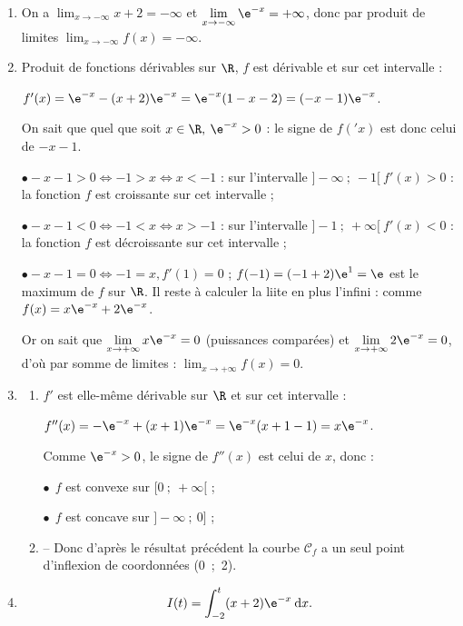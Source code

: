 \begin{enumerate}
\item 
On a $\displaystyle\lim_{x \to -\infty} x + 2 = - \infty$ et $\displaystyle\lim_{x \to -\infty}
\e^{-x} = + \infty$, donc par produit de limites $\displaystyle\lim_{x \to -\infty}f(x) = - \infty$.

\item 
Produit de fonctions dérivables sur $\R$, $f$ est dérivable et sur cet intervalle :

$f'(x) = \e^{-x} - (x + 2)\e^{-x} = \e^{-x}(1 - x - 2) = (- x - 1)\e^{-x}$.

On sait que quel que soit $x \in \R, \: \e^{-x} > 0$ : le signe de $f('x)$ est donc celui de $- x - 1$.

$\bullet -x - 1 > 0 \iff - 1 > x \iff x < - 1$ : sur l'intervalle $]- \infty~;~-1[ \: f'(x) > 0$ : la fonction $f$ est croissante sur cet intervalle ;

$\bullet -x - 1 < 0 \iff - 1 < x \iff x > - 1$ : sur l'intervalle $]-1 ~;~+\infty[\: f'(x) < 0$ : la fonction $f$ est décroissante sur cet intervalle ;

$\bullet -x - 1 = 0 \iff - 1 = x, f'(1) = 0$ ; $f(-1) = (-1 + 2)\e^{1} = \e$ est le maximum de $f$ sur $\R$.
Il reste à calculer la liite en plus l'infini : comme $f(x) = x\e^{-x} + 2\e^{-x}$.

Or on sait que $\displaystyle\lim_{x \to + \infty} x\e^{-x} = 0$ (puissances comparées) et $\displaystyle\lim_{x \to + \infty} 2\e^{-x} = 0$, d'où par somme de limites :
$\displaystyle\lim_{x \to + \infty} f(x) = 0$.

\item 
	\begin{enumerate}
		\item 
$f'$ est elle-même dérivable sur $\R$ et sur cet intervalle :

$f''(x) = -\e^{-x} + (x + 1)\e^{-x} = \e^{-x}(x + 1 - 1) = x \e^{-x}$.

Comme $\e^{-x} > 0$, le signe de $f''(x)$ est celui de $x$, donc :

$\bullet~~$$f$ est convexe sur $[0~;~+ \infty[$ ;

$\bullet~~$$f$ est concave sur $]- \infty~;~0]$ ;
		\item 
-- Donc d'après le résultat précédent la courbe $\mathcal{C}_f$ a un seul point d'inflexion de coordonnées (0~;~2).
	\end{enumerate}
\item 
\[I(t) = \displaystyle\int_{-2}^t (x + 2)\e^{-x}\:\text{d}x.\]


\end{enumerate}
